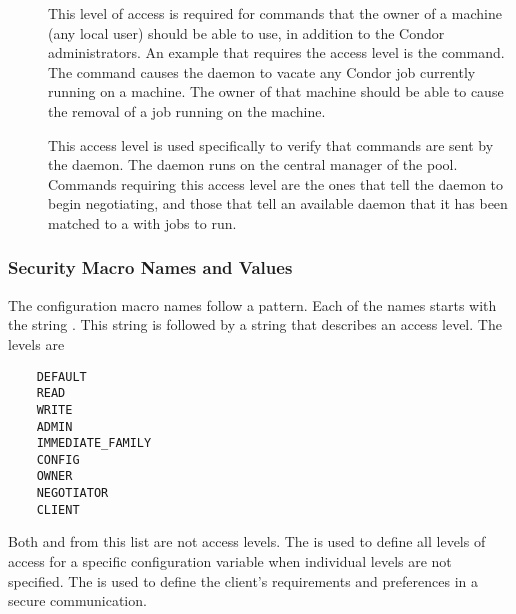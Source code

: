 \begin{description}
\item[] \label{sec-level-owner} This level of access is
   required for commands that the owner of a machine (any local user)
   should be able to use, in addition to the Condor administrators.
   An example that requires the  access level is
   the  command.
   The command causes the  daemon to vacate any
   Condor job currently running on a machine.
   The owner of that machine should be able to cause the removal
   of a job running on the machine.

\item[] \label{sec-level-negotiator} This 
   access level is used specifically to verify that commands are
   sent by the  daemon.
   The  daemon runs on the central manager of
   the pool.
   Commands requiring this access
   level are the ones that tell the  daemon to begin
   negotiating, and those that tell an available  daemon
   that it has been matched to a  with jobs to run.

\end{description}

\subsubsection{\label{sec:Security-NamesValues} Security Macro Names and Values}



The configuration macro names follow a pattern.
Each of the names starts with the string
.
This string is followed by a string that describes an
access level.
The levels are
\begin{verbatim}
    DEFAULT
    READ
    WRITE
    ADMIN
    IMMEDIATE_FAMILY
    CONFIG
    OWNER
    NEGOTIATOR
    CLIENT
\end{verbatim}
Both  and  
from this list are not access levels.
The  is used to define all levels of access
for a specific configuration variable when individual levels
are not specified.
The  is used to define the client's requirements
and preferences in a secure communication.

